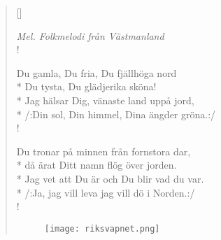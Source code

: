 \begin{verse}[\versewidth]

\flagverse{}
\emph{Mel. Folkmelodi från Västmanland}\\!


Du gamla, Du fria, Du fjällhöga nord\\*
Du tysta, Du glädjerika sköna!\\*
Jag hälsar Dig, vänaste land uppå jord,\\*
/:Din sol, Din himmel, Dina ängder gröna.:/\\!


Du tronar på minnen från fornstora dar,\\*
då ärat Ditt namn flög över jorden.\\*
Jag vet att Du är och Du blir vad du var.\\*
/:Ja, jag vill leva jag vill dö i Norden.:/\\!




\begin{figure}[H]
    \centering
    \texttt{[image: riksvapnet.png]}
\end{figure}



\end{verse}
